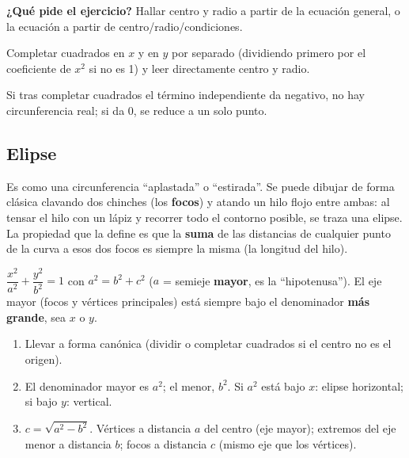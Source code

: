 \documentclass[11pt,a4paper]{article}
\newcommand{\qpide}[1]{\textbf{¿Qué pide el ejercicio?} #1\par}
\begin{document}
\qpide{Hallar centro y radio a partir de la ecuación general, o la ecuación a partir de
centro/radio/condiciones.}

\begin{proc}
Completar cuadrados en $x$ y en $y$ por separado (dividiendo primero por el coeficiente
de $x^2$ si no es 1) y leer directamente centro y radio.
\end{proc}

\begin{atencion}
Si tras completar cuadrados el término independiente da negativo, no hay circunferencia
real; si da 0, se reduce a un solo punto.
\end{atencion}

\subsection{Elipse}

\begin{intuicion}
Es como una circunferencia ``aplastada'' o ``estirada''. Se puede dibujar de forma
clásica clavando dos chinches (los \textbf{focos}) y atando un hilo flojo entre ambas: al
tensar el hilo con un lápiz y recorrer todo el contorno posible, se traza una elipse. La
propiedad que la define es que la \textbf{suma} de las distancias de cualquier punto de
la curva a esos dos focos es siempre la misma (la longitud del hilo).
\end{intuicion}

\begin{teoria}
$\dfrac{x^2}{a^2}+\dfrac{y^2}{b^2}=1$ con $a^2=b^2+c^2$ ($a$ = semieje \textbf{mayor}, es
la ``hipotenusa''). El eje mayor (focos y vértices principales) está siempre bajo el
denominador \textbf{más grande}, sea $x$ o $y$.
\end{teoria}

\begin{proc}
\begin{enumerate}
    \item Llevar a forma canónica (dividir o completar cuadrados si el centro no es el
    origen).
    \item El denominador mayor es $a^2$; el menor, $b^2$. Si $a^2$ está bajo $x$: elipse
    horizontal; si bajo $y$: vertical.
    \item $c=\sqrt{a^2-b^2}$. Vértices a distancia $a$ del centro (eje mayor); extremos
    del eje menor a distancia $b$; focos a distancia $c$ (mismo eje que los vértices).
\end{enumerate}
\end{proc}
\end{document}
